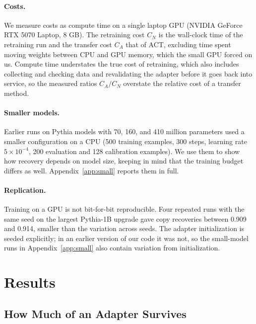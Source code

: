 \documentclass[ijds,nonblindrev]{informs4}
\begin{document}
\paragraph{Costs.} We measure costs as compute time on a single laptop GPU (NVIDIA GeForce RTX 5070 Laptop, 8 GB). The retraining cost $C_N$ is the wall-clock time of the retraining run and the transfer cost $C_A$ that of ACT, excluding time spent moving weights between CPU and GPU memory, which the small GPU forced on us. Compute time understates the true cost of retraining, which also includes collecting and checking data and revalidating the adapter before it goes back into service, so the measured ratios $C_A/C_N$ overstate the relative cost of a transfer method.

\paragraph{Smaller models.} Earlier runs on Pythia models with 70, 160, and 410 million parameters used a smaller configuration on a CPU (500 training examples, 300 steps, learning rate $5\times10^{-4}$, 200 evaluation and 128 calibration examples). We use them to show how recovery depends on model size, keeping in mind that the training budget differs as well. Appendix~\ref{app:small} reports them in full.

\paragraph{Replication.} Training on a GPU is not bit-for-bit reproducible. Four repeated runs with the same seed on the largest Pythia-1B upgrade gave copy recoveries between 0.909 and 0.914, smaller than the variation across seeds. The adapter initialization is seeded explicitly; in an earlier version of our code it was not, so the small-model runs in Appendix~\ref{app:small} also contain variation from initialization.

\section{Results}\label{sec:results}

\subsection{How Much of an Adapter Survives}\label{sec:survival}
\end{document}
